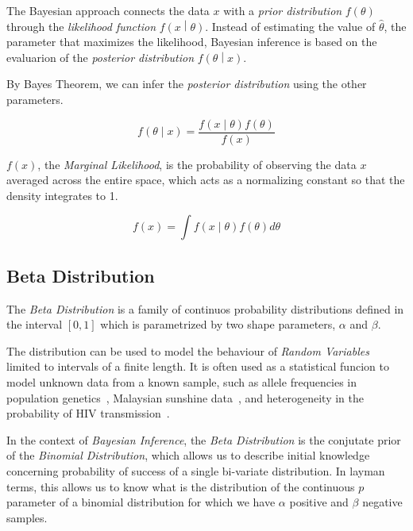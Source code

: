 The Bayesian approach connects the data \( x \) with a \emph{prior distribution} \( f \left( \theta \right) \) through the \emph{likelihood function} \( f \left( x \middle| \theta \right) \). Instead of estimating the value of \( \hat{\theta} \), the parameter that maximizes the likelihood, Bayesian inference is based on the evaluarion of the \emph{posterior distribution} \( f \left( \theta \middle| x \right) \).

By Bayes Theorem, we can infer the \emph{posterior distribution} using the other parameters.

\begin{equation}
f \left( \theta \mid x \right) = \frac{f \left( x \mid \theta \right) f \left( \theta \right)}{f \left( x \right)}
\label{bayes}
\end{equation}

$f(x)$, the \emph{Marginal Likelihood}, is the probability of observing the data $x$ averaged across the entire space, which acts as a normalizing constant so that the density integrates to 1.

\begin{equation}
f \left( x \right) = \int f \left( x \mid \theta \right) f \left( \theta \right) d \theta
\label{marginal}
\end{equation}

\subsection{Beta Distribution}
\label{subsec:beta}

The \emph{Beta Distribution} is a family of continuos probability distributions defined in the interval $\left[ 0, 1 \right]$ which is parametrized by two shape parameters, $\alpha$ and $\beta$.

The distribution can be used to model the behaviour of \emph{Random Variables} limited to intervals of a finite length. It is often used as a statistical funcion to model unknown data from a known sample, such as allele frequencies in population genetics~\cite{Balding1995}, Malaysian sunshine data~\cite{Sulaiman1999573}, and heterogeneity in the probability of HIV transmission~\cite{SIM:SIM4780080110}.

In the context of \emph{Bayesian Inference}, the \emph{Beta Distribution} is the conjutate prior of the \emph{Binomial Distribution}, which allows us to describe initial knowledge concerning probability of success of a single bi-variate distribution. In layman terms, this allows us to know what is the distribution of the continuous $p$ parameter of a binomial distribution for which we have $\alpha$ positive and $\beta$ negative samples.

